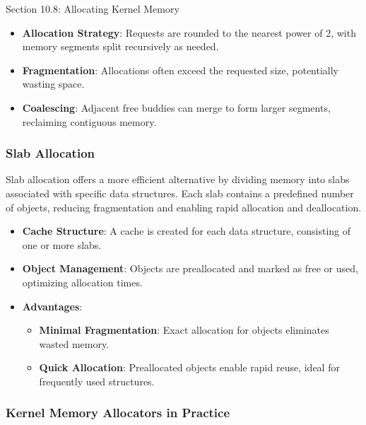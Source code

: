 \begin{notes}{Section 10.8: Allocating Kernel Memory}
\begin{highlight}
    \begin{itemize}
        \item \textbf{Allocation Strategy}: Requests are rounded to the nearest power of 2, with memory segments split recursively as needed.
        \item \textbf{Fragmentation}: Allocations often exceed the requested size, potentially wasting space.
        \item \textbf{Coalescing}: Adjacent free buddies can merge to form larger segments, reclaiming contiguous memory.
    \end{itemize}
    
    \end{highlight}
    
    \subsubsection*{Slab Allocation}
    
    Slab allocation offers a more efficient alternative by dividing memory into slabs associated with specific data structures. Each slab contains a predefined number of objects, reducing fragmentation 
    and enabling rapid allocation and deallocation.
    
    \begin{highlight}
    
    \begin{itemize}
        \item \textbf{Cache Structure}: A cache is created for each data structure, consisting of one or more slabs.
        \item \textbf{Object Management}: Objects are preallocated and marked as free or used, optimizing allocation times.
        \item \textbf{Advantages}: 
            \begin{itemize}
                \item \textbf{Minimal Fragmentation}: Exact allocation for objects eliminates wasted memory.
                \item \textbf{Quick Allocation}: Preallocated objects enable rapid reuse, ideal for frequently used structures.
            \end{itemize}
    \end{itemize}
    
    \end{highlight}
    
    \subsubsection*{Kernel Memory Allocators in Practice}
    

\end{notes}
